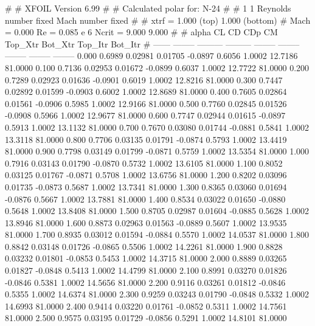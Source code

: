 #  
#       XFOIL         Version 6.99
#  
# Calculated polar for: N-24                                            
#  
# 1 1 Reynolds number fixed          Mach number fixed         
#  
# xtrf =   1.000 (top)        1.000 (bottom)  
# Mach =   0.000     Re =     0.085 e 6     Ncrit =   9.000  9.000
#  
#   alpha    CL        CD       CDp       CM     Top_Xtr  Bot_Xtr  Top_Itr  Bot_Itr
#  ------ -------- --------- --------- -------- -------- -------- -------- --------
   0.000   0.6989   0.02981   0.01705  -0.0897   0.6056   1.0002  12.7186  81.0000
   0.100   0.7136   0.02953   0.01672  -0.0899   0.6037   1.0002  12.7722  81.0000
   0.200   0.7289   0.02923   0.01636  -0.0901   0.6019   1.0002  12.8216  81.0000
   0.300   0.7447   0.02892   0.01599  -0.0903   0.6002   1.0002  12.8689  81.0000
   0.400   0.7605   0.02864   0.01561  -0.0906   0.5985   1.0002  12.9166  81.0000
   0.500   0.7760   0.02845   0.01526  -0.0908   0.5966   1.0002  12.9677  81.0000
   0.600   0.7747   0.02944   0.01615  -0.0897   0.5913   1.0002  13.1132  81.0000
   0.700   0.7670   0.03080   0.01744  -0.0881   0.5841   1.0002  13.3118  81.0000
   0.800   0.7706   0.03135   0.01791  -0.0874   0.5793   1.0002  13.4419  81.0000
   0.900   0.7798   0.03149   0.01799  -0.0871   0.5759   1.0002  13.5354  81.0000
   1.000   0.7916   0.03143   0.01790  -0.0870   0.5732   1.0002  13.6105  81.0000
   1.100   0.8052   0.03125   0.01767  -0.0871   0.5708   1.0002  13.6756  81.0000
   1.200   0.8202   0.03096   0.01735  -0.0873   0.5687   1.0002  13.7341  81.0000
   1.300   0.8365   0.03060   0.01694  -0.0876   0.5667   1.0002  13.7881  81.0000
   1.400   0.8534   0.03022   0.01650  -0.0880   0.5648   1.0002  13.8408  81.0000
   1.500   0.8705   0.02987   0.01604  -0.0885   0.5628   1.0002  13.8946  81.0000
   1.600   0.8873   0.02963   0.01563  -0.0889   0.5607   1.0002  13.9535  81.0000
   1.700   0.8935   0.03012   0.01594  -0.0884   0.5570   1.0002  14.0537  81.0000
   1.800   0.8842   0.03148   0.01726  -0.0865   0.5506   1.0002  14.2261  81.0000
   1.900   0.8828   0.03232   0.01801  -0.0853   0.5453   1.0002  14.3715  81.0000
   2.000   0.8889   0.03265   0.01827  -0.0848   0.5413   1.0002  14.4799  81.0000
   2.100   0.8991   0.03270   0.01826  -0.0846   0.5381   1.0002  14.5656  81.0000
   2.200   0.9116   0.03261   0.01812  -0.0846   0.5355   1.0002  14.6374  81.0000
   2.300   0.9259   0.03243   0.01790  -0.0848   0.5332   1.0002  14.6993  81.0000
   2.400   0.9414   0.03220   0.01761  -0.0852   0.5311   1.0002  14.7561  81.0000
   2.500   0.9575   0.03195   0.01729  -0.0856   0.5291   1.0002  14.8101  81.0000
